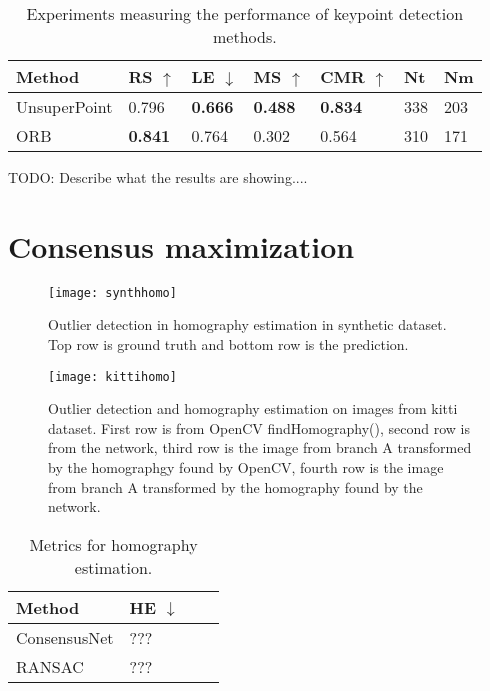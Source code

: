 \begin{table}[H]
\centering
\begin{tabular}{|l|l|l|l|l|l|l|}
\hline
Method & RS $\uparrow$ & LE $\downarrow$ & MS $\uparrow$ & CMR $\uparrow$ & Nt & Nm \\
\hline
UnsuperPoint & 0.796 & \textbf{0.666} & \textbf{0.488} & \textbf{0.834} & 338 & 203 \\
ORB & \textbf{0.841} & 0.764 & 0.302 & 0.564 & 310 & 171 \\
\hline
\end{tabular}
\caption{Experiments measuring the performance of keypoint detection methods.}
\label{table:pointsbenchmark}
\end{table}

TODO: Describe what the results are showing....

\section{Consensus maximization}

\begin{figure}[H]
	\centering
	\texttt{[image: synthhomo]}
	\caption{Outlier detection in homography estimation in synthetic dataset. Top row is ground truth and bottom row is the prediction.}
	\label{fig:synthhomo}
\end{figure}

\begin{figure}[H]
	\centering
	\texttt{[image: kittihomo]}
	\caption{Outlier detection and homography estimation on images from kitti dataset. First row is from OpenCV findHomography(), second row is from the network, third row is the image from branch A transformed by the homographgy found by OpenCV, fourth row is the image from branch A transformed by the homography found by the network.}
	\label{fig:kittihomo}
\end{figure}

\begin{table}[H]
	\centering
	\begin{tabular}{|l|l|l|l|}
		\hline
		Method & HE $\downarrow$ \\
		\hline
		ConsensusNet & ??? \\
		RANSAC & ??? \\
		\hline
	\end{tabular}
	\caption{Metrics for homography estimation.}
	\label{table:pointsbenchmark}
\end{table}

